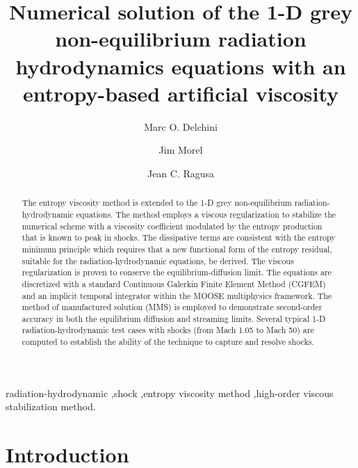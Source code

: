 \documentclass[review]{elsarticle}
\begin{document}
%
\begin{frontmatter}
%
\title{Numerical solution of the 1-D grey non-equilibrium radiation hydrodynamics equations with an entropy-based artificial viscosity}
\author{Marc O. Delchini}

\author{Jim Morel}

\author{Jean C. Ragusa}

\address[label1]{Department of Nuclear Engineering, Texas A\&M University, College Station, TX 77843, USA }

\begin{abstract}
The entropy viscosity method is extended to the 1-D grey non-equilibrium radiation-hydrodynamic equations. 
The method employs a viscous regularization to stabilize the numerical scheme with a viscosity coefficient modulated by the entropy production that is known to peak in shocks. The dissipative terms are consistent with the entropy minimum principle which requires that a new functional form of the entropy residual, suitable for the radiation-hydrodynamic equations, be derived. The viscous regularization is proven to conserve the equilibrium-diffusion limit. The equations are discretized with a standard Continuous Galerkin Finite Element Method (CGFEM) and an implicit temporal integrator within the MOOSE multiphysics framework. The method of manufactured solution (MMS) is employed to demonstrate second-order accuracy in both the equilibrium diffusion and streaming limits. Several typical 1-D radiation-hydrodynamic test cases with shocks (from Mach 1.05 to Mach 50) are computed to establish the ability of the technique to capture and resolve shocks.
\end{abstract}
%
\begin{keyword}
radiation-hydrodynamic \sep shock \sep entropy viscosity method \sep high-order viscous stabilization method.
\end{keyword}
%
\end{frontmatter}
%
\linenumbers
%
\section{Introduction}
\label{sec:section1}
\end{document}

